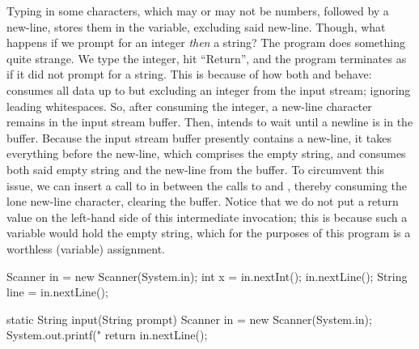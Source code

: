 Typing in some characters, which may or may not be numbers, followed by a new-line, stores them in the  variable, excluding said new-line. Though, what happens if we prompt for an integer \textit{then} a string? The program does something quite strange. We type the integer, hit ``Return'', and the program terminates as if it did not prompt for a string. This is because of how both  and  behave:  consumes all data up to but excluding an integer from the input stream; ignoring leading whitespaces. So, after consuming the integer, a new-line character remains in the input stream buffer. Then,  intends to wait until a newline is in the buffer. Because the input stream buffer presently contains a new-line, it takes everything before the new-line, which comprises the empty string, and consumes both said empty string and the new-line from the buffer. To circumvent this issue, we can insert a call to  in between the calls to  and , thereby consuming the lone new-line character, clearing the buffer. Notice that we do not put a return value on the left-hand side of this intermediate  invocation; this is because such a variable would hold the empty string, which for the purposes of this program is a worthless (variable) assignment.

\begin{verbnobox}[\footnotesize]
Scanner in = new Scanner(System.in);
int x = in.nextInt();
in.nextLine();
String line = in.nextLine();
\end{verbnobox}


\begin{verbnobox}[\footnotesize]
static String input(String prompt) {
  Scanner in = new Scanner(System.in);
  System.out.printf("%
  return in.nextLine();
}
\end{verbnobox}

